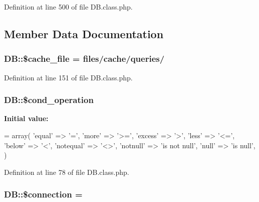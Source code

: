 Definition at line 500 of file D\+B.\+class.\+php.



\subsection{Member Data Documentation}
\hypertarget{classDB_a9952a27cbf07942e5bb8853ab95b5bdb}{}
\subsubsection[{\$cache\+\_\+file}]{\setlength{\rightskip}{0pt plus 5cm}D\+B\+::\$cache\+\_\+file = \textquotesingle{}files/cache/queries/\textquotesingle{}}\label{classDB_a9952a27cbf07942e5bb8853ab95b5bdb}


Definition at line 151 of file D\+B.\+class.\+php.

\hypertarget{classDB_a85f8f65c37474b0e65d844e1f01f39b0}{}
\subsubsection[{\$cond\+\_\+operation}]{\setlength{\rightskip}{0pt plus 5cm}D\+B\+::\$cond\+\_\+operation}\label{classDB_a85f8f65c37474b0e65d844e1f01f39b0}
{\bfseries Initial value\+:}
\begin{DoxyCode}
= array(
        \textcolor{stringliteral}{'equal'} => \textcolor{charliteral}{'='},
        \textcolor{stringliteral}{'more'} => \textcolor{stringliteral}{'>='},
        \textcolor{stringliteral}{'excess'} => \textcolor{charliteral}{'>'},
        \textcolor{stringliteral}{'less'} => \textcolor{stringliteral}{'<='},
        \textcolor{stringliteral}{'below'} => \textcolor{charliteral}{'<'},
        \textcolor{stringliteral}{'notequal'} => \textcolor{stringliteral}{'<>'},
        \textcolor{stringliteral}{'notnull'} => \textcolor{stringliteral}{'is not null'},
        \textcolor{stringliteral}{'null'} => \textcolor{stringliteral}{'is null'},
    )
\end{DoxyCode}


Definition at line 78 of file D\+B.\+class.\+php.

\hypertarget{classDB_ac9071e31f8241ad644430537f39a16ce}{}
\subsubsection[{\$connection}]{\setlength{\rightskip}{0pt plus 5cm}D\+B\+::\$connection = \textquotesingle{}\textquotesingle{}}\label{classDB_ac9071e31f8241ad644430537f39a16ce}


